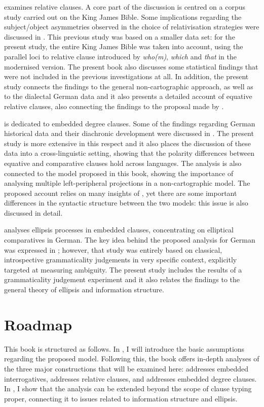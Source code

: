  examines relative clauses. A core part of the discussion is centred on a corpus study carried out on the King James Bible. Some implications regarding the subject/object asymmetries observed in the choice of relativisation strategies were discussed in \citet{bacskaiatkari2020nordlyd}. This previous study was based on a smaller data set: for the present study, the entire King James Bible was taken into account, using the parallel loci to relative clause introduced by \textit{who(m)}, \textit{which} and \textit{that} in the modernised version. The present book also discusses some statistical findings that were not included in the previous investigations at all. In addition, the present study connects the findings to the general non-cartographic approach, as well as to the dialectal German data and it also presents a detailed account of equative relative clauses, also connecting the findings to the proposal made by \citet{brandnerbraeuning2013}.

 is dedicated to embedded degree clauses. Some of the findings regarding German historical data and their diachronic development were discussed in \citet{bacskaiatkari2021oup}. The present study is more extensive in this respect and it also places the discussion of these data into a cross-linguistic setting, showing that the polarity differences between equative and comparative clauses hold across languages. The analysis is also connected to the model proposed in this book, showing the importance of analysing multiple left-peripheral projections in a non-cartographic model. The proposed account relies on many insights of \citet{jaeger2018}, yet there are some important differences in the syntactic structure between the two models: this issue is also discussed in detail.

 analyses ellipsis processes in embedded clauses, concentrating on elliptical comparatives in German. The key idea behind the proposed analysis for German was expressed in \citet{bacskaiatkari2017atoh}; however, that study was entirely based on classical, introspective grammaticality judgements in very specific context, explicitly targeted at measuring ambiguity. The present study includes the results of a grammaticality judgement experiment and it also relates the findings to the general theory of ellipsis and information structure.

\section{Roadmap}
This book is structured as follows. In , I will introduce the basic assumptions regarding the proposed model. Following this, the book offers in-depth analyses of the three major constructions that will be examined here:  addresses embedded interrogatives,  addresses relative clauses, and  addresses embedded degree clauses. In , I show that the analysis can be extended beyond the scope of clause typing proper, connecting it to issues related to information structure and ellipsis.
